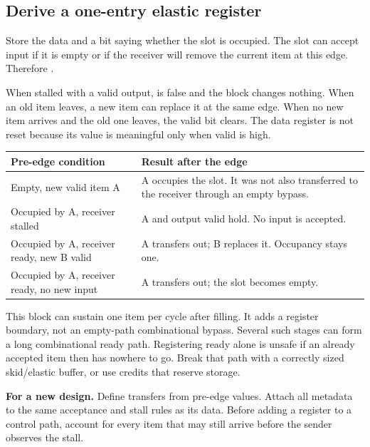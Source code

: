 \documentclass[11pt]{article}
\newcommand{\cd}[1]{{\frenchspacing\texttt{\detokenize{#1}}}}
\newcommand{\svfile}[1]{\par\noindent\begin{minipage}{\linewidth}\end{minipage}\par}
\newcommand{\transfer}[1]{\par\textbf{For a new design.} #1\par}
\begin{document}
\subsection{Derive a one-entry elastic register}
Store the data and a bit saying whether the slot is occupied.
The slot can accept input if it is empty or if the receiver will remove the current item at this edge.
Therefore \cd{in_ready = !out_valid || out_ready}.
\svfile{examples/rv_register.sv}
When stalled with a valid output, \cd{in_ready} is false and the block changes nothing.
When an old item leaves, a new item can replace it at the same edge.
When no new item arrives and the old one leaves, the valid bit clears.
The data register is not reset because its value is meaningful only when valid is high.

\begin{longtable}{@{}L{4.8cm}L{11.2cm}@{}}
\toprule Pre-edge condition & Result after the edge \\ \midrule\endhead
Empty, new valid item A & A occupies the slot. It was not also transferred to the receiver through an empty bypass.\\
Occupied by A, receiver stalled & A and output valid hold. No input is accepted.\\
Occupied by A, receiver ready, new B valid & A transfers out; B replaces it. Occupancy stays one.\\
Occupied by A, receiver ready, no new input & A transfers out; the slot becomes empty.\\
\bottomrule
\end{longtable}
This block can sustain one item per cycle after filling. It adds a register boundary, not an empty-path combinational bypass.
Several such stages can form a long combinational ready path. Registering ready alone is unsafe if an already accepted item then has nowhere to go.
Break that path with a correctly sized skid/elastic buffer, or use credits that reserve storage.
\transfer{Define transfers from pre-edge values. Attach all metadata to the same acceptance and stall rules as its data.
Before adding a register to a control path, account for every item that may still arrive before the sender observes the stall.}
\end{document}
